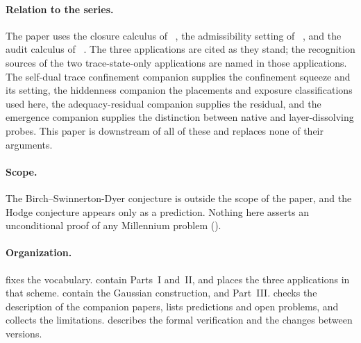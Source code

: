 \paragraph{Relation to the series.}  The paper uses the closure
calculus of \FOne\ \cite{Tsiokos2026EmergenceCalculus}, the
admissibility setting of \FTwo\ \cite{Tsiokos2026FoundationsII}, and the
audit calculus of \FThree\ \cite{Tsiokos2026FoundationsIII}.  The three
applications \cite{Tsiokos2026NavierStokes,Tsiokos2026RH,Tsiokos2026PvNP}
are cited as they stand; the recognition sources of the two
trace-state-only applications are named in those applications.  The
self-dual trace confinement companion \cite{Tsiokos2026SDTC} supplies
the confinement squeeze and its setting, the hiddenness companion
\cite{Tsiokos2026CSL} the placements and exposure classifications used
here, the adequacy-residual companion \cite{Tsiokos2026XiCompanion} supplies
the residual, and the emergence companion \cite{Tsiokos2026NeedleKiller}
supplies the distinction between native and layer-dissolving probes.
This paper is downstream of all of these and replaces none of their
arguments.

\paragraph{Scope.}  The Birch--Swinnerton-Dyer conjecture
\cite{Wiles2000BSD} is outside the scope of the paper, and the Hodge
conjecture \cite{Deligne2000Hodge} appears only as a prediction.  Nothing
here asserts an unconditional proof of any Millennium problem
().

\paragraph{Organization.}   fixes the vocabulary.
 contain Parts~I and~II, and
 places the three applications in that scheme.
 contain the Gaussian
construction, and  Part~III.
 checks the description of the companion papers,
 lists predictions and open problems, and
 collects the limitations.
 describes the formal verification and
 the changes between versions.
